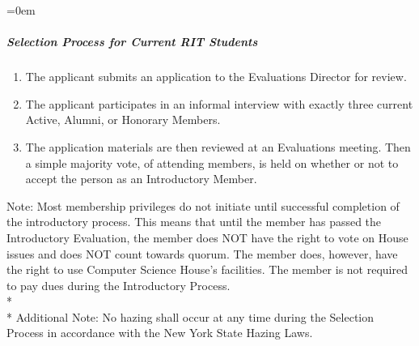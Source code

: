 \documentclass{article}
\newcommand{\asubsubsubsection}[1]{\parindent=0em\subparagraph{#1} \label{#1}}
\begin{document}
\asubsubsubsection{Selection Process for Current RIT Students}
\begin{enumerate}
	\item The applicant submits an application to the Evaluations Director for review.
	\item The applicant participates in an informal interview with exactly three current Active, Alumni, or Honorary Members.
	\item The application materials are then reviewed at an Evaluations meeting.
	Then a simple majority vote, of attending members, is held on whether or not to accept the person as an Introductory Member.
\end{enumerate}
Note: Most membership privileges do not initiate until successful completion of the introductory process.
This means that until the member has passed the Introductory Evaluation, the member does NOT have the right to vote on House issues and does NOT count towards quorum.
The member does, however, have the right to use Computer Science House's facilities.
The member is not required to pay dues during the Introductory Process.
\\* \\*
Additional Note: No hazing shall occur at any time during the Selection Process in accordance with the New York State Hazing Laws.
\end{document}
